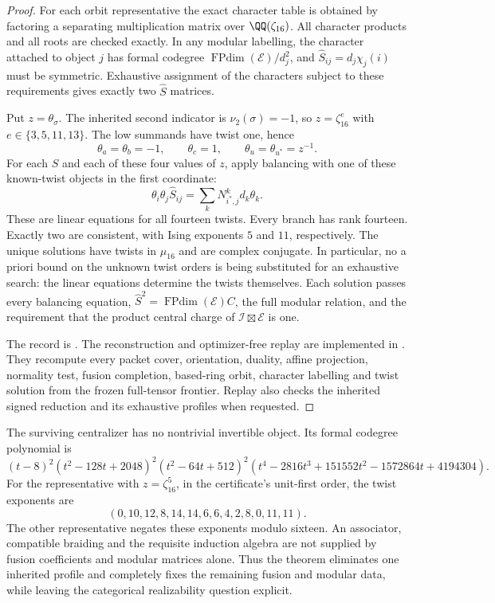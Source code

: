 \begin{proof}
For each orbit representative the exact character table is obtained by
factoring a separating multiplication matrix over $\QQ(\zeta_{16})$.
All character products and all roots are checked exactly. In any modular
labelling, the character attached to object $j$ has formal codegree
$\operatorname{FPdim}(\mathcal E)/d_j^2$, and
$\widehat S_{ij}=d_j\chi_j(i)$ must be symmetric. Exhaustive assignment
of the characters subject to these requirements gives exactly two
$\widehat S$ matrices.

Put $z=\theta_\sigma$. The inherited second indicator is
$\nu_2(\sigma)=-1$, so
$z=\zeta_{16}^{e}$ with $e\in\{3,5,11,13\}$.
The low summands have twist one, hence
\[
 \theta_a=\theta_b=-1,\qquad \theta_c=1,\qquad
 \theta_u=\theta_{u^*}=z^{-1}.
\]
For each $S$ and each of these four values of $z$, apply balancing
with one of these known-twist objects in the first coordinate:
\[
 \theta_i\theta_j\widehat S_{ij}
   =\sum_k N_{i^*,j}^{k}d_k\theta_k.
\]
These are linear equations for all fourteen twists. Every branch has
rank fourteen. Exactly two are consistent, with Ising exponents $5$
and $11$, respectively. The unique solutions have twists in
$\mu_{16}$ and are complex conjugate. In particular, no a priori bound
on the unknown twist orders is being substituted for an exhaustive
search: the linear equations determine the twists themselves.
Each solution passes every balancing equation,
$\widehat S^2=\operatorname{FPdim}(\mathcal E)C$, the full modular
relation, and the requirement that the product central charge of
$\mathcal I\boxtimes\mathcal E$ is one.

The record is
.
The reconstruction and optimizer-free replay are implemented in
. They recompute every packet
cover, orientation, duality, affine projection, normality test, fusion
completion, based-ring orbit, character labelling and twist solution
from the frozen full-tensor frontier. Replay also checks the inherited
signed reduction and its exhaustive profiles when requested.
\end{proof}

The surviving centralizer has no nontrivial invertible object. Its formal
codegree polynomial is
\[
 (t-8)^2(t^2-128t+2048)^2(t^2-64t+512)^2
 (t^4-2816t^3+151552t^2-1572864t+4194304).
\]
For the representative with $z=\zeta_{16}^5$, in the certificate's
unit-first order, the twist exponents are
\[
 (0,10,12,8,14,14,6,6,4,2,8,0,11,11).
\]
The other representative negates these exponents modulo sixteen.
An associator, compatible braiding and the requisite induction algebra
are not supplied by fusion coefficients and modular matrices alone.
Thus the theorem eliminates one inherited profile and completely fixes
the remaining fusion and modular data, while leaving the categorical
realizability question explicit.

